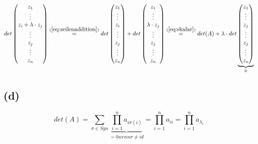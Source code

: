 \documentclass{article} %
\begin{document}
\begin{equation*}
    det \begin{pmatrix}
 z_1 \\
\vdots \\
z_i + \lambda \cdot z_j \\
\vdots \\
z_j \\
\vdots \\
 z_n
 \end{pmatrix} \overset{(\ref{eq:zeilenaddition})}{=} det \begin{pmatrix}
 z_1 \\
\vdots \\
z_i \\
\vdots \\
z_j \\
\vdots \\
 z_n
 \end{pmatrix}  + det \begin{pmatrix}
 z_1 \\
\vdots \\
 \lambda \cdot z_j \\
\vdots \\
z_j \\
\vdots \\
 z_n
 \end{pmatrix}  \overset{(\ref{eq:skalar})}{=} det(A) + \lambda \cdot det  \underbrace{\begin{pmatrix}
 z_1 \\
\vdots \\
z_j \\
\vdots \\
z_j \\
\vdots \\
 z_n
 \end{pmatrix}}_0
\end{equation*}

\subsection{(d)}
\begin{equation*}
    det (A) = \sum_{\sigma \in Sgn} \underbrace{\prod_{i=1}^n a_{i \sigma(i)}}_{= 0 wenn \sigma \neq id} = \prod_{i=1}^n a_{ii} = \prod_{i=1}^n a_{\lambda_i}
\end{equation*}
\end{document}
